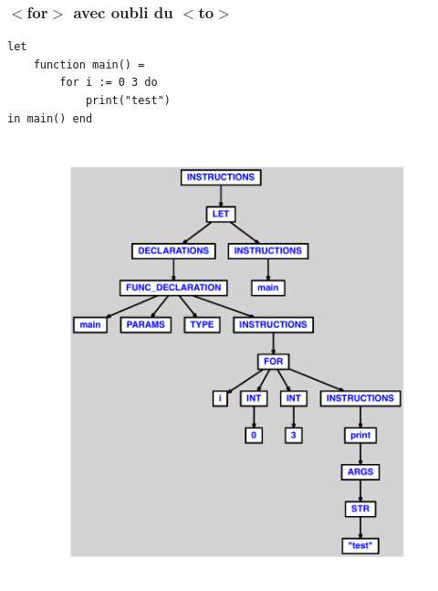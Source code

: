 \documentclass{article}
\begin{document}
\subsubsection{$ < $for$ > $ avec oubli du $ < $to$ > $}
\begin{lstlisting}
let
	function main() =
		for i := 0 3 do
			print("test")
in main() end
\end{lstlisting}
\newpage
\begin{figure}[H]
\centering
\includegraphics[max width=\textwidth]{ast/ast_200.pdf}
\end{figure}
\newpage
\end{document}
